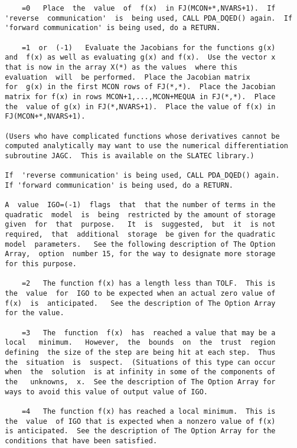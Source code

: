 \begin{verbatim}
      =0   Place  the  value  of  f(x)  in FJ(MCON+*,NVARS+1).  If
  'reverse  communication'  is  being used, CALL PDA_DQED() again.  If
  'forward communication' is being used, do a RETURN.

      =1  or  (-1)   Evaluate the Jacobians for the functions g(x)
  and  f(x) as well as evaluating g(x) and f(x).  Use the vector x
  that is now in the array X(*) as the values  where this
  evaluation  will  be performed.  Place the Jacobian matrix
  for  g(x) in the first MCON rows of FJ(*,*).  Place the Jacobian
  matrix for f(x) in rows MCON+1,...,MCON+MEQUA in FJ(*,*).  Place
  the  value of g(x) in FJ(*,NVARS+1).  Place the value of f(x) in
  FJ(MCON+*,NVARS+1).

  (Users who have complicated functions whose derivatives cannot be
  computed analytically may want to use the numerical differentiation
  subroutine JAGC.  This is available on the SLATEC library.)

  If  'reverse communication' is being used, CALL PDA_DQED() again.
  If 'forward communication' is being used, do a RETURN.

  A  value  IGO=(-1)  flags  that  that the number of terms in the
  quadratic  model  is  being  restricted by the amount of storage
  given  for  that  purpose.   It  is  suggested,  but  it  is not
  required,  that  additional  storage  be given for the quadratic
  model  parameters.   See the following description of The Option
  Array,  option  number 15, for the way to designate more storage
  for this purpose.

      =2   The function f(x) has a length less than TOLF.  This is
  the  value  for  IGO to be expected when an actual zero value of
  f(x)  is  anticipated.   See the description of The Option Array
  for the value.

      =3   The  function  f(x)  has  reached a value that may be a
  local   minimum.   However,  the  bounds  on  the  trust  region
  defining  the size of the step are being hit at each step.  Thus
  the  situation  is  suspect.  (Situations of this type can occur
  when  the  solution  is at infinity in some of the components of
  the   unknowns,  x.  See the description of The Option Array for
  ways to avoid this value of output value of IGO.

      =4   The function f(x) has reached a local minimum.  This is
  the  value  of IGO that is expected when a nonzero value of f(x)
  is anticipated.  See the description of The Option Array for the
  conditions that have been satisfied.


\end{verbatim}
